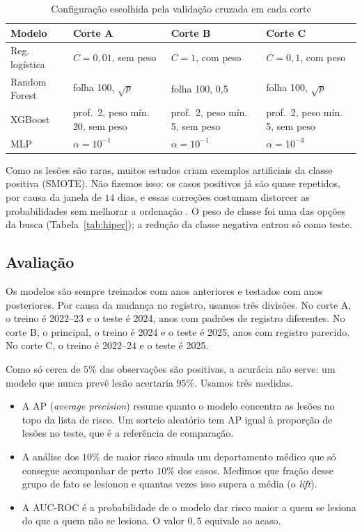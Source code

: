 \documentclass[conference]{IEEEtran}
\begin{document}
\begin{table}[!t]
\caption{Configuração escolhida pela validação cruzada em cada corte}
\label{tab:escolhidas}
\centering
\footnotesize
\setlength{\tabcolsep}{3pt}
\begin{tabular}{>{\raggedright\arraybackslash}p{} >{\raggedright\arraybackslash}p{} >{\raggedright\arraybackslash}p{} >{\raggedright\arraybackslash}p{}}
\toprule
Modelo & Corte A & Corte B & Corte C \\
\midrule
Reg. logística & $C = 0{,}01$, sem peso & $C = 1$, com peso & $C = 0{,}1$, com peso \\
Random Forest & folha 100, $\sqrt{p}$ & folha 100, 0,5 & folha 100, $\sqrt{p}$ \\
XGBoost & prof.~2, peso mín. 20, sem peso & prof.~2, peso mín. 5, sem peso & prof.~2, peso mín. 5, sem peso \\
MLP & $\alpha = 10^{-1}$ & $\alpha = 10^{-1}$ & $\alpha = 10^{-3}$ \\
\bottomrule
\end{tabular}
\end{table}

Como as lesões são raras, muitos estudos criam exemplos artificiais da classe positiva (SMOTE). Não fizemos isso: os casos positivos já são quase repetidos, por causa da janela de $14$ dias, e essas correções costumam distorcer as probabilidades sem melhorar a ordenação \cite{vandengoorbergh2022}. O peso de classe foi uma das opções da busca (Tabela~\ref{tab:hiper}); a redução da classe negativa entrou só como teste.

\subsection{Avaliação}
\label{sec:protocolo}

Os modelos são sempre treinados com anos anteriores e testados com anos posteriores. Por causa da mudança no registro, usamos três divisões. No corte A, o treino é 2022--23 e o teste é 2024, anos com padrões de registro diferentes. No corte B, o principal, o treino é 2024 e o teste é 2025, anos com registro parecido. No corte C, o treino é 2022--24 e o teste é 2025.

Como só cerca de $5\%$ das observações são positivas, a acurácia não serve: um modelo que nunca prevê lesão acertaria $95\%$. Usamos três medidas.

\begin{itemize}
  \item A AP (\textit{average precision}) resume quanto o modelo concentra as lesões no topo da lista de risco. Um sorteio aleatório tem AP igual à proporção de lesões no teste, que é a referência de comparação.
  \item A análise dos $10\%$ de maior risco simula um departamento médico que só consegue acompanhar de perto $10\%$ dos casos. Medimos que fração desse grupo de fato se lesionou e quantas vezes isso supera a média (o \textit{lift}).
  \item A AUC-ROC é a probabilidade de o modelo dar risco maior a quem se lesiona do que a quem não se lesiona. O valor $0{,}5$ equivale ao acaso.
\end{itemize}
\end{document}
